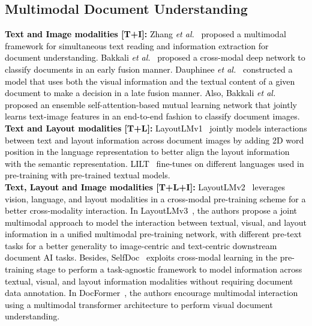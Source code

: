 \documentclass[preprint,review,12pt]{elsarticle}
\newcommand{\etal}{\textit{et al.}}
\begin{document}
\subsection{Multimodal Document Understanding}
\textcolor{black}{\noindent\textbf{Text and Image modalities [T+I]:}
Zhang \etal~\cite{zhang2021trie} proposed a multimodal framework for simultaneous text reading and information extraction for document understanding. Bakkali \etal~\cite{bakkali2020cross, bakkali2020visual} proposed a cross-modal deep network to classify documents in an early fusion manner. Dauphinee \etal~\cite{dauphinee2019modular} constructed a model that uses both the visual information and the textual content of a given document to make a decision in a late fusion manner. Also, Bakkali \etal~\cite{bakkali2021eaml} proposed an ensemble self-attention-based mutual learning network that jointly learns text-image features in an end-to-end fashion to classify document images. \\
\noindent\textbf{Text and Layout modalities [T+L]:} LayoutLMv1~\cite{LayoutLMv1} jointly models interactions between text and layout information across document images by adding 2D word position in the language representation to better align the layout information with the semantic representation. 
LILT~\cite{wang2022lilt} fine-tunes on different languages used in pre-training with pre-trained textual models. \\
\noindent\textbf{Text, Layout and Image modalities [T+L+I]:}  LayoutLMv2~\cite{xu2022layoutlmv2} leverages vision, language, and layout modalities in a cross-modal pre-training scheme for a better cross-modality interaction. In LayoutLMv3~\cite{huang2022layoutlmv3}, the authors propose a joint multimodal approach to model the interaction between textual, visual, and layout information in a unified multimodal pre-training network, with different pre-text tasks for a better generality to image-centric and text-centric downstream document AI tasks. Besides, SelfDoc~\cite{li2021selfdoc} exploits cross-modal learning in the pre-training stage to perform a task-agnostic framework to model information across textual, visual, and layout information modalities without requiring document data annotation. In DocFormer~\cite{appalaraju2021docformer}, the authors encourage multimodal interaction using a multimodal transformer architecture to perform visual document understanding.} 
\end{document}
